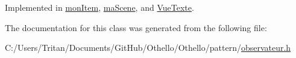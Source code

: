 Implemented in \hyperlink{classmon_item_a51ecb94c04bf5b437afd10ccdadda801}{mon\+Item}, \hyperlink{classma_scene_a1a985741a00343a2024fb30154912140}{ma\+Scene}, and \hyperlink{class_vue_texte_a5922b46ef0801278f9817358e521298d}{Vue\+Texte}.



The documentation for this class was generated from the following file\+:\begin{DoxyCompactItemize}
\item 
C\+:/\+Users/\+Tritan/\+Documents/\+Git\+Hub/\+Othello/\+Othello/pattern/\hyperlink{observateur_8h}{observateur.\+h}\end{DoxyCompactItemize}
